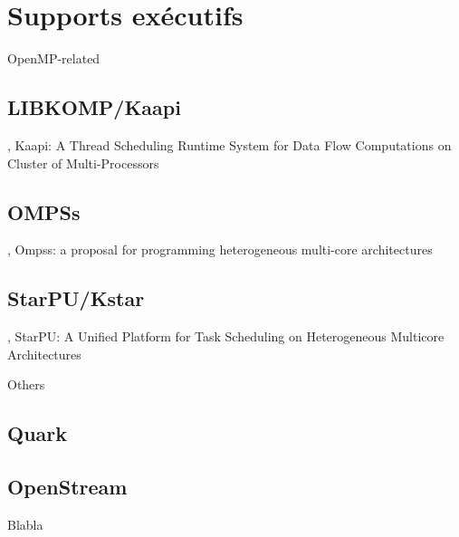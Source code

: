 \section{Supports exécutifs}\label{sec:rw:runtimes}


OpenMP-related

\subsection{LIBKOMP/Kaapi}
\cite{Gautier2007}, Kaapi: A Thread Scheduling Runtime System for Data Flow Computations on Cluster of Multi-Processors


\subsection{OMPSs}

\cite{OMPSs}, Ompss: a proposal for programming heterogeneous multi-core architectures

\subsection{StarPU/Kstar}

\cite{StarPU}, StarPU: A Unified Platform for Task Scheduling on Heterogeneous Multicore Architectures


Others

\subsection{Quark}
\subsection{OpenStream}

Blabla
